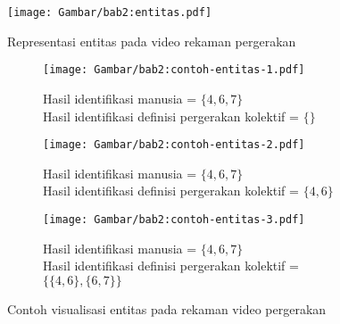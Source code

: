 \begin{figure}[t]
    \centering
    \texttt{[image: Gambar/bab2:entitas.pdf]}
    \caption{Representasi entitas pada video rekaman pergerakan}
    \label{bab2:entitas}
\end{figure}

\begin{figure}[h]
    \centering
    \begin{subfigure}[h]{0.3\textwidth}
        \centering
        \texttt{[image: Gambar/bab2:contoh-entitas-1.pdf]}
        \caption{Hasil identifikasi manusia = $\{4, 6, 7\}$ \\ Hasil identifikasi definisi pergerakan kolektif = $\{\}$}
    \end{subfigure} \hspace{0.25cm}
    \begin{subfigure}[h]{0.3\textwidth}
        \centering
        \texttt{[image: Gambar/bab2:contoh-entitas-2.pdf]}
        \caption{Hasil identifikasi manusia = $\{4, 6, 7\}$ \\ Hasil identifikasi definisi pergerakan kolektif = $\{4, 6\}$}
    \end{subfigure} \hspace{0.25cm}
    \begin{subfigure}[h]{0.3\textwidth}
        \centering
        \texttt{[image: Gambar/bab2:contoh-entitas-3.pdf]}
        \caption{Hasil identifikasi manusia = $\{4, 6, 7\}$ \\ Hasil identifikasi definisi pergerakan kolektif = $\{\{4, 6\}, \{6, 7\}\}$}
    \end{subfigure}
    \caption{Contoh visualisasi entitas pada rekaman video pergerakan}
    \label{bab2:contoh-visualisasi-entitas}
\end{figure}